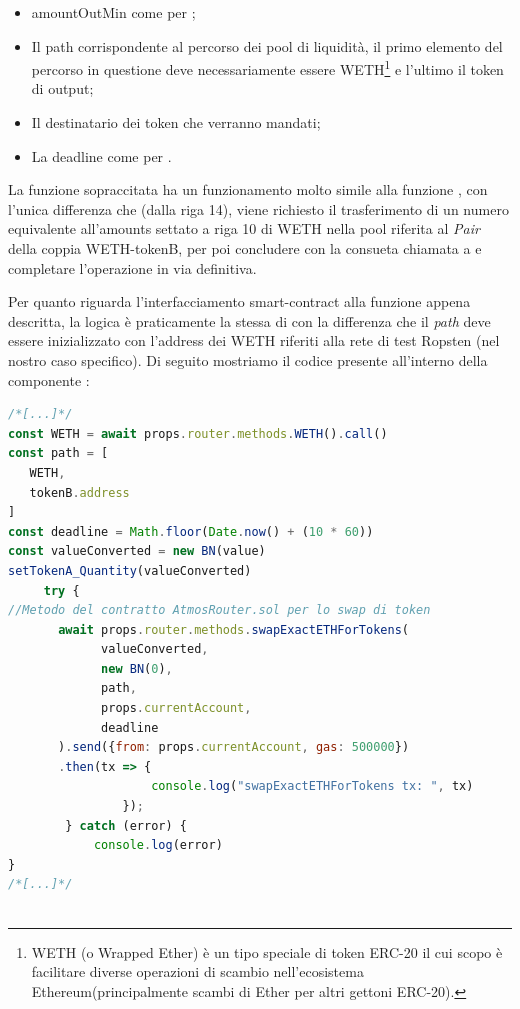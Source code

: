  \begin{itemize}
\item {amountOutMin} come per ;
\item Il {path} corrispondente al percorso dei pool di liquidità, il primo elemento del percorso in questione deve necessariamente essere WETH\footnote{WETH (o Wrapped Ether) è un tipo speciale di token ERC-20 il cui scopo è facilitare diverse operazioni di scambio nell'ecosistema Ethereum(principalmente scambi di Ether per altri gettoni ERC-20).} e l'ultimo il token di output;
\item Il {destinatario} dei token che verranno mandati;
\item La {deadline} come per .
 \end{itemize}
 
 La funzione sopraccitata ha un funzionamento molto simile alla funzione \textcourier{\ref{swapExactTokensForTokens}}, con l'unica differenza che (dalla riga 14), viene richiesto il trasferimento di un numero equivalente all'amounts settato a riga 10 di WETH nella pool riferita al \textit{Pair} della coppia WETH-tokenB, per poi concludere con la consueta chiamata a  e completare l'operazione in via definitiva.
 
 
 Per quanto riguarda l'interfacciamento smart-contract alla funzione appena descritta, la logica è praticamente la stessa di \textcourier{\ref{swapExactTokensForTokens(front-end)}}
 con la differenza che il \textit{path} deve essere inizializzato con l'address dei WETH riferiti alla rete di test Ropsten (nel nostro caso specifico). Di seguito mostriamo il codice presente all'interno della componente :\\

\begin{lstlisting}[caption={[Call \textcourier{swapExactETHForTokens()} Function (front-end) ]},language=jsx] 
/*[...]*/
const WETH = await props.router.methods.WETH().call()
const path = [
   WETH,
   tokenB.address
]
const deadline = Math.floor(Date.now() + (10 * 60))
const valueConverted = new BN(value)
setTokenA_Quantity(valueConverted)
     try {
//Metodo del contratto AtmosRouter.sol per lo swap di token
       await props.router.methods.swapExactETHForTokens(
             valueConverted,
             new BN(0),
             path,
             props.currentAccount,
             deadline
       ).send({from: props.currentAccount, gas: 500000})
       .then(tx => {
                    console.log("swapExactETHForTokens tx: ", tx)
                });
        } catch (error) {
            console.log(error)
}
/*[...]*/
                                                                                             -swapExactETHForTokens(front-end)
\end{lstlisting}\makeatletter{}\makeatother
\label{swapExactETHForTokens(front-end)}

